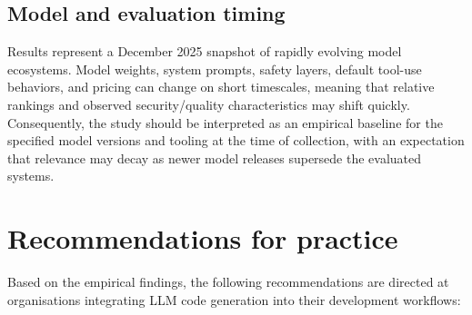 \subsection{Model and evaluation timing}
\label{sec:validity_timing}

Results represent a December 2025 snapshot of rapidly evolving model ecosystems. Model weights, system prompts, safety layers, default tool-use behaviors, and pricing can change on short timescales, meaning that relative rankings and observed security/quality characteristics may shift quickly. Consequently, the study should be interpreted as an empirical baseline for the specified model versions and tooling at the time of collection, with an expectation that relevance may decay as newer model releases supersede the evaluated systems.


\section{Recommendations for practice}

Based on the empirical findings, the following recommendations are directed at organisations integrating LLM code generation into their development workflows:

